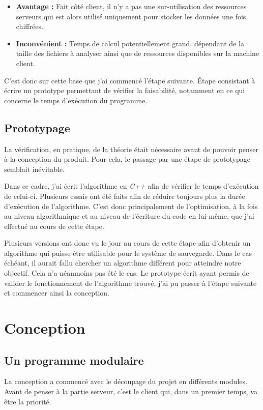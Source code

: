 \documentclass[a4paper,10pt, twoside]{report}
\begin{document}
\begin{spacing}{1.2}
\begin{itemize}
 \item \textbf{Avantage :} Fait côté client, il n'y a pas une
 sur-utilisation des ressources serveurs qui est alors utilisé uniquement
 pour stocker les données une fois chiffrées.
 
 \item \textbf{Inconvénient :} Temps de calcul potentiellement grand,
 dépendant de la taille des fichiers à analyser ainsi que de ressources
 disponibles sur la machine client.
\end{itemize}

C'est donc sur cette base que j'ai commencé l'étape suivante. Étape 
consistant à écrire un prototype permettant de vérifier la faisabilité,
notamment en ce qui concerne le temps d'exécution du programme.

\subsection{Prototypage}
La vérification, en pratique, de la théorie était nécessaire avant de
pouvoir penser à la conception du produit. Pour cela, le passage par une
étape de prototypage semblait inévitable.

Dans ce cadre, j'ai écrit l'algorithme en \textit{C++} afin de vérifier
le temps d'exécution de celui-ci. Plusieurs essais ont été faits afin de
réduire toujours plus la durée d'exécution de l'algorithme. C'est donc
principalement de l'optimisation, à la fois au niveau algorithmique et
au niveau de l'écriture du code en lui-même, que j'ai effectué  au
cours de cette étape.

Plusieurs versions ont donc vu le jour au cours de cette étape afin d'obtenir
un algorithme qui puisse être utilisable pour le système de sauvegarde. Dans
le cas échéant, il aurait fallu chercher un algorithme différent pour
atteindre notre objectif. Cela n'a néanmoins pas été le cas. Le
prototype écrit ayant permis de valider le fonctionnement de l'algorithme
trouvé, j'ai pu passer à l'étape suivante et commencer ainsi la
conception.

\section{Conception}
\subsection{Un programme modulaire}
La conception a commencé avec le découpage du projet en différents
modules. Avant de penser à la partie serveur, c'est le client qui, dans un
premier temps, va être la priorité.


\end{spacing}
\end{document}
